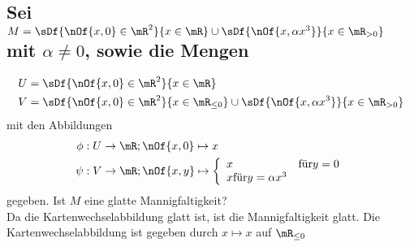 \subsection{Sei $M = \sDf{\nOf{x,0}\in\mR^2}{x\in\mR}\cup\sDf{\nOf{x,\alpha x^3}}{x\in\mR_{>0}}$ mit $\alpha\neq 0$, sowie die Mengen}
\begin{align}
	U & = \sDf{\nOf{x,0}\in\mR^2}{x\in\mR} \\
	V & = \sDf{\nOf{x,0}\in\mR^2}{x\in\mR_{\leq 0}}\cup\sDf{\nOf{x,\alpha x^3}}{x\in\mR_{>0}}
\end{align}
mit den Abbildungen
\begin{align}
	\phi &: U \to \mR; \nOf{x,0} \mapsto x \\
	\psi &: V \to \mR; \nOf{x,y} \mapsto \left\{\begin{array}{l l}x & \text{für} y = 0\\x \text{für} y = \alpha x^3\end{array}\right.
\end{align}
gegeben. Ist $M$ eine glatte Mannigfaltigkeit?\\
Da die Kartenwechselabbildung glatt ist, ist die Mannigfaltigkeit glatt. Die Kartenwechselabbildung ist gegeben durch $x\mapsto x$ auf $\mR_{\leq 0}$
